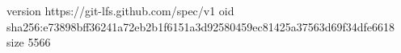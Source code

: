 version https://git-lfs.github.com/spec/v1
oid sha256:e73898bff36241a72eb2b1f6151a3d92580459ec81425a37563d69f34dfe6618
size 5566
